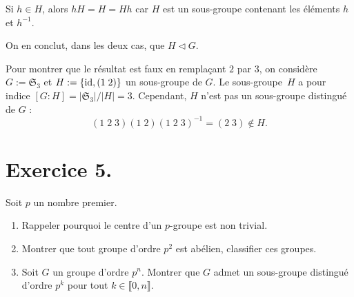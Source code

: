 \documentclass[./main]{subfiles}
\begin{document}
  Si $h \in H$, alors $h H = H = H h$ car $H$ est un sous-groupe contenant les éléments $h$ et $h^{-1}$.

  On en conclut, dans les deux cas, que $H \triangleleft G$.

  Pour montrer que le résultat est faux en remplaçant $2$ par $3$, on considère $G := \mathfrak{S}_3$ et $H := \{\operatorname{id}, (1\;2)\}$ un sous-groupe de $G$.
  Le sous-groupe~$H$ a pour indice $[G : H] = |\mathfrak{S}_3| / |H| = 3$.
  Cependant, $H$ n'est pas un sous-groupe distingué de $G$ : \[
    (1\;2\;3)(1\;2)(1\;2\;3)^{-1} = (2\;3) \not\in H
  .\]

  \section{Exercice 5.}
  \begin{enonce}
    Soit $p$ un nombre premier.
    \begin{enumerate}
      \item Rappeler pourquoi le centre d'un $p$-groupe est non trivial.\label{td2-ex5-q1}
      \item Montrer que tout groupe d'ordre $p^2$ est abélien, classifier ces groupes.
      \item Soit $G$ un groupe d'ordre $p^n$. Montrer que $G$ admet un sous-groupe distingué d'ordre $p^k$ pour tout $k \in \llbracket 0, n \rrbracket$.
    \end{enumerate}
  \end{enonce}
  
\end{document}

